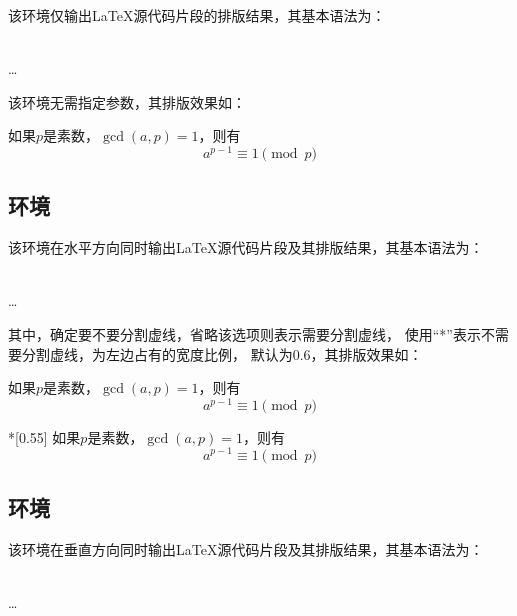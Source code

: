 \documentclass{ctexart}
\newcommand{\qtmark}[1]{“#1”}
\begin{document}
该环境仅输出\LaTeX 源代码片段的排版结果，其基本语法为：

\begin{command}
 \\
\ldots \\
\end{command}

该环境无需指定参数，其排版效果如：

\begin{outonly}
如果$p$是素数，$\gcd(a,p)=1$，则有
$$a^{p-1} \equiv 1 \pmod{p}$$
\end{outonly}

\subsection{环境}

该环境在水平方向同时输出\LaTeX 源代码片段及其排版结果，其基本语法为：

\begin{command}
 \\
\ldots \\
\end{command}

其中，确定要不要分割虚线，省略该选项则表示需要分割虚线，
使用\qtmark{*}表示不需要分割虚线，为左边占有的宽度比例，
默认为0.6，其排版效果如：

\begin{texdemoh}[0.7]
如果$p$是素数，$\gcd(a,p)=1$，则有
$$a^{p-1} \equiv 1 \pmod{p}$$
\end{texdemoh}

\begin{texdemoh}*[0.55]
如果$p$是素数，$\gcd(a,p)=1$，则有
$$a^{p-1} \equiv 1 \pmod{p}$$
\end{texdemoh}

\subsection{环境}

该环境在垂直方向同时输出\LaTeX 源代码片段及其排版结果，其基本语法为：

\begin{command}
 \\
\ldots \\
\end{command}
\end{document}
